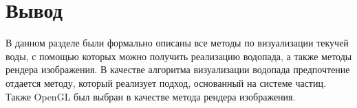 \section*{Вывод}

В данном разделе были формально описаны все методы по визуализации текучей воды, с помощью которых можно получить реализацию водопада, а также методы рендера изображения. В качестве алгоритма визуализации водопада предпочтение отдается методу, который реализует подход, основанный на системе частиц. Также OpenGL был выбран в качестве метода рендера изображения.

